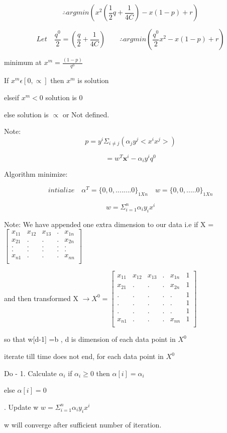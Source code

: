 \documentclass{article}
\begin{document}
\[ \therefore argmin(x^2( \frac{1}{2} q + \frac{1}{4C}) - x(1-p) + r ) \]

\[ Let \quad \frac{ q ^0 }{2} = ( \frac{q}{2} + \frac{1}{4C} ) \qquad   \therefore argmin( \frac{ q ^0}{2} x^2 - x(1-p) + r ) \]




  minimum at $ x^m = \frac{ (1-p) }{ q^0 } $
  
  If $ x^m \epsilon [0,\varpropto] $ then $ x^m $ is solution
  
   elseif $ x^m < 0 $ solution is 0
   
    else solution is  $ \varpropto $ or Not defined.
  
  
Note: 
\[ p = y^i\Sigma _{i \neq j}  (  \alpha _j  y^j < x^i x^j > ) \]

\[ = w^T \textbf{x} ^i - \alpha _i  y^i q^0 \]

Algorithm minimize:

\[ intialize  \quad \alpha ^ T  =  \{ 0,0,........0 \}  _{ 1Xn } \quad w = \{ 0,0, .....0 \} _{1Xn} \]

\[ { w= \Sigma _{i=1} ^n \alpha _i y_i x^i } \]


Note: We have appended one extra dimension to our data i.e if X = $ \begin{bmatrix}
    x_{11} & x_{12} & x_{13} &  .& x_{1n}  \\
    x_{21} & . & . & . & x_{2n} \\
    . & . & . & .& . \\
    . & . & . & .& . \\
    x_{n1} & . & . & .  & x_{nn} \\
  \end{bmatrix} $


 and then transformed  X $ \rightarrow X^0 = \begin{bmatrix}
    x_{11} & x_{12} & x_{13} &  .& x_{1n} & 1  \\
    x_{21} & . & . & . & x_{2n} & 1\\
    . & . & . & .& . & 1\\
    . & . & . & .& . & 1\\
    . & . & . & .& . & 1\\
    x_{n1} & . & . & .  & x_{nn} & 1\\
  \end{bmatrix} $
 
 
 so that w[d-1] =b , {d is dimension of each data point in $ X^0 $ }
 
 iterate till time does not end, for each data point in $ X^0 $ 
 
 \vspace{2mm}
   
 
 \quad Do - 1. Calculate $ \alpha _i $ if $ \alpha _i \geqslant 0 $ then $ \alpha [i] = \alpha _i $
 
\qquad \qquad \qquad \qquad else $ \alpha [i] = 0$
 
   . Update w $ w= \Sigma _{i=1} ^n \alpha _i y_i x^i $
  
w will converge after sufficient number of iteration.   
     
   
\end{document}
